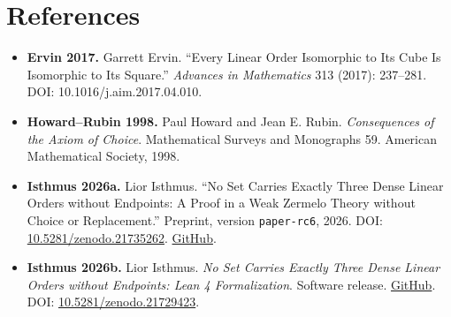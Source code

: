 \documentclass[
  english,
  11pt,
  reqno]{amsart}
\providecommand{\tightlist}{%
  \setlength{\itemsep}{0pt}\setlength{\parskip}{0pt}}
\begin{document}
\protect{}\label{sec:references}

\section{References}\label{references}

\protect{}\label{ref:ervin2017}

\begin{itemize}
\tightlist
\item
  \textbf{Ervin 2017.} Garrett Ervin. ``Every Linear Order Isomorphic to
  Its Cube Is Isomorphic to Its Square.'' \emph{Advances in Mathematics}
  313 (2017): 237--281. DOI: 10.1016/j.aim.2017.04.010.
\end{itemize}

\protect{}\label{ref:howardrubin1998}

\begin{itemize}
\tightlist
\item
  \textbf{Howard--Rubin 1998.} Paul Howard and Jean E. Rubin.
  \emph{Consequences of the Axiom of Choice}. Mathematical Surveys and
  Monographs 59. American Mathematical Society, 1998.
\end{itemize}

\protect{}\label{ref:isthmus2026a}

\begin{itemize}
\tightlist
\item
  \textbf{Isthmus 2026a.} Lior Isthmus. ``No Set Carries Exactly Three
  Dense Linear Orders without Endpoints: A Proof in a Weak Zermelo
  Theory without Choice or Replacement.'' Preprint, version
  \texttt{paper-rc6}, 2026. DOI:
  \href{https://doi.org/10.5281/zenodo.21735262}{10.5281/zenodo.21735262}.
  \href{https://github.com/lioristhmus/no-exactly-three-dlo}{GitHub}.
\end{itemize}

\protect{}\label{ref:isthmus2026b}

\begin{itemize}
\tightlist
\item
  \textbf{Isthmus 2026b.} Lior Isthmus. \emph{No Set Carries Exactly
  Three Dense Linear Orders without Endpoints: Lean 4 Formalization}.
  Software release.
  \href{https://github.com/lioristhmus/no-exactly-three-dlo-lean}{GitHub}.
  DOI:
  \href{https://doi.org/10.5281/zenodo.21729423}{10.5281/zenodo.21729423}.
\end{itemize}

\protect{}\label{ref:isthmus2026c}
\end{document}

